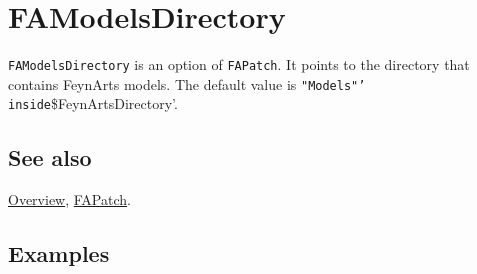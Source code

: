 \documentclass[../FeynCalcManual.tex]{subfiles}
\begin{document}
\hypertarget{famodelsdirectory}{
\section{FAModelsDirectory}\label{famodelsdirectory}}

\texttt{FAModelsDirectory} is an option of \texttt{FAPatch}. It points
to the directory that contains FeynArts models. The default value is
\texttt{"Models"' inside}\$FeynArtsDirectory'.

\subsection{See also}

\hyperlink{toc}{Overview}, \hyperlink{fapatch}{FAPatch}.

\subsection{Examples}
\end{document}
